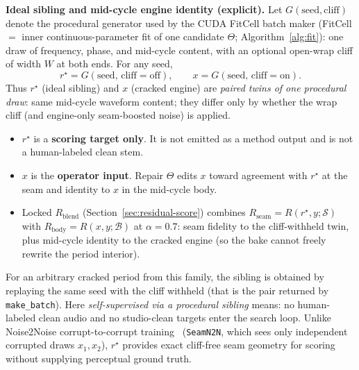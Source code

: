 \textbf{Ideal sibling and mid-cycle engine identity (explicit).}
Let $G(\mathrm{seed},\mathrm{cliff})$ denote the procedural generator used by the CUDA FitCell batch maker
(FitCell $=$ inner continuous-parameter fit of one candidate $\Theta$; Algorithm~\ref{alg:fit}):
one draw of frequency, phase, and mid-cycle content, with an optional open-wrap cliff of width $W$ at both ends.
For any seed,
\begin{equation}
\label{eq:G-siblings}
r^{\star}=G(\mathrm{seed},\,\mathrm{cliff{=}off}),\qquad
x=G(\mathrm{seed},\,\mathrm{cliff{=}on}).
\end{equation}
Thus $r^{\star}$ (ideal sibling) and $x$ (cracked engine) are \emph{paired twins of one procedural draw}:
same mid-cycle waveform content; they differ only by whether the wrap cliff (and engine-only seam-boosted noise) is applied.
\begin{itemize}
  \item $r^{\star}$ is a \textbf{scoring target only}. It is not emitted as a method output and is not a human-labeled clean stem.
  \item $x$ is the \textbf{operator input}. Repair $\Theta$ edits $x$ toward agreement with $r^{\star}$ at the seam and identity to $x$ in the mid-cycle body.
  \item Locked $R_{\mathrm{blend}}$ (Section~\ref{sec:residual-score}) combines $R_{\mathrm{seam}}=R(r^{\star},y;\mathcal{S})$ with $R_{\mathrm{body}}=R(x,y;\mathcal{B})$ at $\alpha{=}0.7$:
    seam fidelity to the cliff-withheld twin, plus mid-cycle identity to the cracked engine (so the bake cannot freely rewrite the period interior).
\end{itemize}
For an arbitrary cracked period from this family, the sibling is obtained by replaying the same seed with the cliff withheld
(that is the pair returned by \texttt{make\_batch}).
Here \emph{self-supervised via a procedural sibling} means: no human-labeled clean audio and no studio-clean targets enter the search loop.
Unlike Noise2Noise corrupt-to-corrupt training~\citep{lehtinen2018,kashyap2021n2n} (\texttt{SeamN2N}, which sees only independent corrupted draws $x_1,x_2$), $r^{\star}$ provides exact cliff-free seam geometry for scoring without supplying perceptual ground truth.

